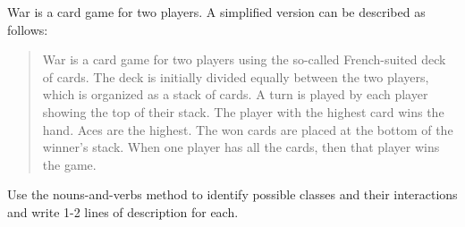 War is a card game for two players. A simplified version can be
described as follows:
\begin{quote}
  War is a card game for two players using the so-called French-suited
  deck of cards. The deck is initially divided equally between the two
  players, which is organized as a stack of cards. A turn is played by
  each player showing the top of their stack. The player with the
  highest card wins the hand. Aces are the highest. The won cards are
  placed at the bottom of the winner's stack. When one player has all
  the cards, then that player wins the game.
\end{quote}
Use the nouns-and-verbs method to identify possible classes and their
interactions and write 1-2 lines of description for each.
